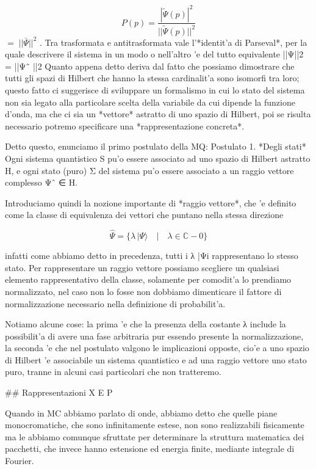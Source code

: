 $$P(p)=\frac{|\tilde{\Psi}(p)|^{2}}{||\tilde{\Psi}(p)||^{2}}$$
$=\;||\bar{\Psi}||^2$  . 
Tra trasformata e antitrasformata vale l'*identit'a di Parseval*, per la quale descrivere il sistema in un modo o nell'altro 'e del tutto equivalente ||Ψ||2 = ||Ψ˜ ||2 Quanto appena detto deriva dal fatto che possiamo dimostrare che tutti gli spazi di Hilbert che hanno la stessa cardinalit'a sono isomorfi tra loro; questo fatto ci suggerisce di sviluppare un formalismo in cui lo stato del sistema non sia legato alla particolare scelta della variabile da cui dipende la funzione d'onda, ma che ci sia un *vettore* astratto di uno spazio di Hilbert, poi se risulta necessario potremo specificare una *rappresentazione concreta*.

Detto questo, enunciamo il primo postulato della MQ:
Postulato 1. *Degli stati* Ogni sistema quantistico S pu'o essere associato ad uno spazio di Hilbert astratto H, e ogni stato (puro) Σ del sistema pu'o essere associato a un raggio vettore complesso Ψˆ ∈ H.

Introduciamo quindi la nozione importante di *raggio vettore*, che 'e definito come la classe di equivalenza dei vettori che puntano nella stessa direzione

$${\hat{\Psi}}=\{\lambda\,|\Psi\rangle\quad|\quad\lambda\in\mathbb{C}-0\}$$

infatti come abbiamo detto in precedenza, tutti i λ |Ψi rappresentano lo stesso stato. Per rappresentare un raggio vettore possiamo scegliere un qualsiasi elemento rappresentativo della classe, solamente per comodit'a lo prendiamo normalizzato, nel caso non lo fosse non dobbiamo dimenticare il fattore di normalizzazione necessario nella definizione di probabilit'a.

Notiamo alcune cose: la prima 'e che la presenza della costante λ include la possibilit'a di avere una fase arbitraria pur essendo presente la normalizzazione, la seconda 'e che nel postulato valgono le implicazioni opposte, cio'e a uno spazio di Hilbert 'e associabile un sistema quantistico e ad una raggio vettore uno stato puro, tranne in alcuni casi particolari che non tratteremo.

## Rappresentazioni X E P

Quando in MC abbiamo parlato di onde, abbiamo detto che quelle piane monocromatiche, che sono infinitamente estese, non sono realizzabili fisicamente ma le abbiamo comunque sfruttate per determinare la struttura matematica dei pacchetti, che invece hanno estensione ed energia finite, mediante integrale di Fourier.

